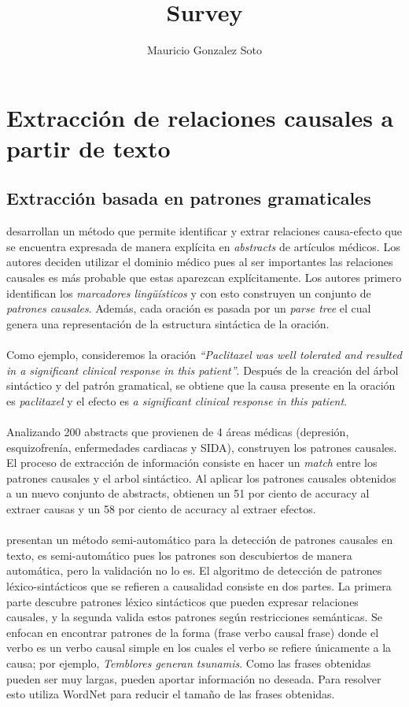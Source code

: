 \documentclass[11pt]{article}
\title{Survey}
\author{Mauricio Gonzalez Soto}
\theoremstyle{plain}
\begin{document}
\nocite{*}
\maketitle
\section{Extracción de relaciones causales a partir de texto}
\subsection{Extracción basada en patrones gramaticales}
\cite{khoo2000extracting} desarrollan un método que permite identificar y extrar relaciones causa-efecto que se encuentra expresada de manera explícita en \textit{abstracts} de artículos médicos. Los autores deciden utilizar el dominio médico pues al ser importantes las relaciones causales es más probable que estas aparezcan explícitamente. Los autores primero identifican los \textit{marcadores lingüísticos} y con esto construyen un conjunto de \textit{patrones causales}. Además, cada oración es pasada por un \textit{parse tree} el cual genera una representación de la estructura sintáctica de la oración.\\
\\
Como ejemplo, consideremos la oración \textit{“Paclitaxel was well tolerated and resulted in a significant clinical response in this patient”}. Después de la creación del árbol sintáctico y del patrón gramatical, se obtiene que la causa presente en la oración es \textit{paclitaxel} y el efecto es \textit{a significant clinical response in this patient}.\\
\\
Analizando 200 abstracts que provienen de 4 áreas médicas (depresión, esquizofrenía, enfermedades cardiacas y SIDA), construyen los patrones causales. El proceso de extracción de información consiste en hacer un \textit{match} entre los patrones causales y el arbol sintáctico. Al aplicar los patrones causales obtenidos a un nuevo conjunto de abstracts, obtienen un 51 por ciento de accuracy al extraer causas y un 58 por ciento de accuracy al extraer efectos.\\
\\
\cite{girju2002text} presentan un método semi-automático para la detección de patrones causales en texto, es semi-automático pues los patrones son descubiertos de manera automática, pero la validación no lo es. El algoritmo de detección de patrones léxico-sintácticos que  se refieren a causalidad consiste en dos partes. La primera parte descubre patrones léxico sintácticos que pueden expresar relaciones causales, y la segunda valida estos patrones según restricciones semánticas. Se enfocan en encontrar patrones de la forma (frase verbo causal frase) donde el verbo es un verbo causal simple en los cuales el verbo se refiere únicamente a la causa; por ejemplo, \textit{Temblores generan tsunamis}. Como las frases obtenidas pueden ser muy largas, pueden aportar información no deseada. Para resolver esto \cite{girju2003automatic} utiliza WordNet para reducir el tamaño de las frases obtenidas.\\
\end{document}
